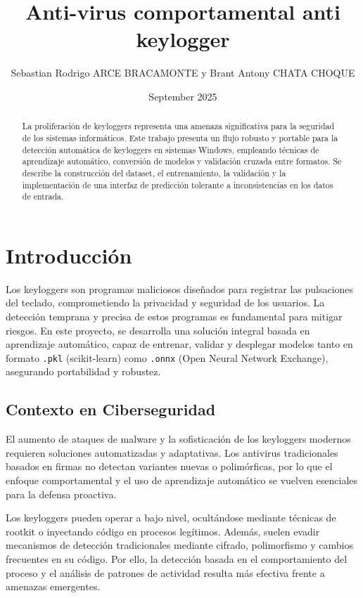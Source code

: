 \documentclass{article}
\title{Anti-virus comportamental anti keylogger}
\author{Sebastian Rodrigo ARCE BRACAMONTE y Brant Antony CHATA CHOQUE}
\date{September 2025}
\begin{document}
\maketitle

\begin{abstract}
La proliferación de keyloggers representa una amenaza significativa para la seguridad de los sistemas informáticos. Este trabajo presenta un flujo robusto y portable para la detección automática de keyloggers en sistemas Windows, empleando técnicas de aprendizaje automático, conversión de modelos y validación cruzada entre formatos. Se describe la construcción del dataset, el entrenamiento, la validación y la implementación de una interfaz de predicción tolerante a inconsistencias en los datos de entrada.
\end{abstract}

\section{Introducción}
Los keyloggers son programas maliciosos diseñados para registrar las pulsaciones del teclado, comprometiendo la privacidad y seguridad de los usuarios. La detección temprana y precisa de estos programas es fundamental para mitigar riesgos. En este proyecto, se desarrolla una solución integral basada en aprendizaje automático, capaz de entrenar, validar y desplegar modelos tanto en formato \texttt{.pkl} (scikit-learn) como \texttt{.onnx} (Open Neural Network Exchange), asegurando portabilidad y robustez.

\subsection*{Contexto en Ciberseguridad}
El aumento de ataques de malware y la sofisticación de los keyloggers modernos requieren soluciones automatizadas y adaptativas. Los antivirus tradicionales basados en firmas no detectan variantes nuevas o polimórficas, por lo que el enfoque comportamental y el uso de aprendizaje automático se vuelven esenciales para la defensa proactiva.

Los keyloggers pueden operar a bajo nivel, ocultándose mediante técnicas de rootkit o inyectando código en procesos legítimos. Además, suelen evadir mecanismos de detección tradicionales mediante cifrado, polimorfismo y cambios frecuentes en su código. Por ello, la detección basada en el comportamiento del proceso y el análisis de patrones de actividad resulta más efectiva frente a amenazas emergentes.
\end{document}
